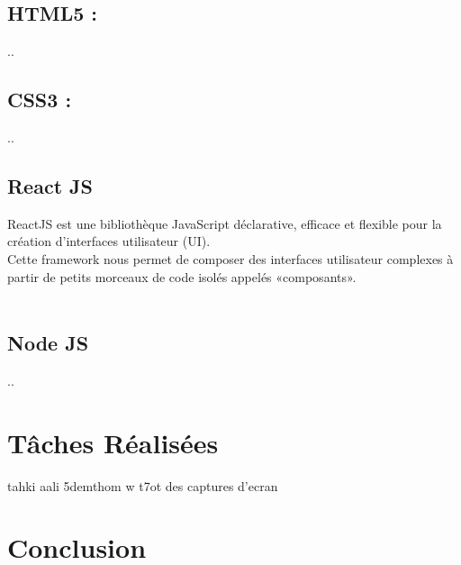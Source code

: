 \subsection{HTML5 :}
..

\subsection{CSS3 :}
..


\subsection{React JS}
ReactJS  \cite{1} est une bibliothèque JavaScript déclarative, efficace et flexible pour la création d'interfaces utilisateur (UI).\\
Cette framework nous permet de composer des interfaces utilisateur complexes à partir de petits morceaux de code isolés appelés «composants». \\ \\

\subsection{Node JS}
..\\

\section{Tâches Réalisées }
tahki aali 5demthom w t7ot des captures d'ecran



\section{Conclusion}
